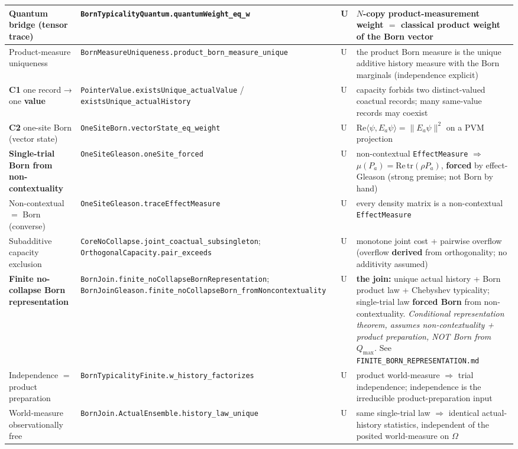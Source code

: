 \documentclass[11pt,a4paper]{article}
\begin{document}
\begin{center}
\begin{tabularx}{\linewidth}{|Y|Y|Y|Y|}
\hline
Quantum bridge (tensor trace) & \texttt{BornTypicalityQuantum.quantumWeight\_eq\_w} & U & $N$-copy product-measurement weight $=$ classical product weight of the Born vector \\
\hline
Product-measure uniqueness & \texttt{BornMeasureUniqueness.product\_born\_measure\_unique} & U & the product Born measure is the unique additive history measure with the Born marginals (independence explicit) \\
\hline
\textbf{C1} one record → one \textbf{value} & \texttt{PointerValue.existsUnique\_actualValue} / \texttt{existsUnique\_actualHistory} & U & capacity forbids two distinct-valued coactual records; many same-value records may coexist \\
\hline
\textbf{C2} one-site Born (vector state) & \texttt{OneSiteBorn.vectorState\_eq\_weight} & U & $\mathrm{Re}\langle\psi,E_a\psi\rangle=\lVert E_a\psi\rVert^2$ on a PVM projection \\
\hline
\textbf{Single-trial Born from non-contextuality} & \texttt{OneSiteGleason.oneSite\_forced} & U & non-contextual \texttt{EffectMeasure} $\Rightarrow$ $\mu(P_a)=\mathrm{Re}\,\mathrm{tr}(\rho P_a)$, \textbf{forced} by effect-Gleason (strong premise; not Born by hand) \\
\hline
Non-contextual $=$ Born (converse) & \texttt{OneSiteGleason.traceEffectMeasure} & U & every density matrix is a non-contextual \texttt{EffectMeasure} \\
\hline
Subadditive capacity exclusion & \texttt{CoreNoCollapse.joint\_coactual\_subsingleton}; \texttt{OrthogonalCapacity.pair\_exceeds} & U & monotone joint cost + pairwise overflow (overflow \textbf{derived} from orthogonality; no additivity assumed) \\
\hline
\textbf{Finite no-collapse Born representation} & \texttt{BornJoin.finite\_noCollapseBornRepresentation}; \texttt{BornJoinGleason.finite\_noCollapseBorn\_fromNoncontextuality} & U & \textbf{the join:} unique actual history + Born product law + Chebyshev typicality; single-trial law \textbf{forced Born} from non-contextuality. \emph{Conditional representation theorem, assumes non-contextuality + product preparation, NOT Born from $Q_{\max}$.} See \texttt{FINITE\_BORN\_REPRESENTATION.md} \\
\hline
Independence $=$ product preparation & \texttt{BornTypicalityFinite.w\_history\_factorizes} & U & product world-measure $\Rightarrow$ trial independence; independence is the irreducible product-preparation input \\
\hline
World-measure observationally free & \texttt{BornJoin.ActualEnsemble.history\_law\_unique} & U & same single-trial law $\Rightarrow$ identical actual-history statistics, independent of the posited world-measure on $\Omega$ \\
\hline
\end{tabularx}
\end{center}
\end{document}
